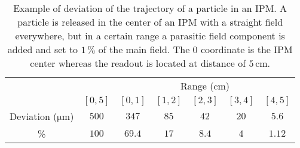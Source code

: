 \begin{table}[ht]
  \centering
  \caption[Example of deviation of the trajectory of a particle in an IPM]
  {Example of deviation of the trajectory of a particle in an IPM. A particle is released in the center of an IPM with a straight field everywhere, but in a certain range a parasitic field component is added and set to $1\,\mathrm{\%}$ of the main field. The 0 coordinate is the IPM center whereas the readout is located at distance of \(5 \, \mathrm{cm}\).}
  \label{chap3:Deviation}
  \begin{tabular}{ccccccc}
    \toprule
                                   &           & \multicolumn{5}{c}{Range (\(\mathrm{cm}\))}                                                 \\
    \cmidrule(lr){3-7}
                                   & \([0,5]\) & \([0,1]\)                                   & \([1,2]\) & \([2,3]\) & \([3,4]\) & \([4,5]\) \\
    \midrule
    Deviation (\(\mathrm{\mu m}\)) & \(500\)   & \(347\)                                     & \(85\)    & \(42\)    & \(20\)    & \(5.6\)   \\
    \%                             & $100$     & $69.4$                                      & $17$      & $8.4$     & $4$       & $1.12$    \\
    \bottomrule
  \end{tabular}
\end{table}

